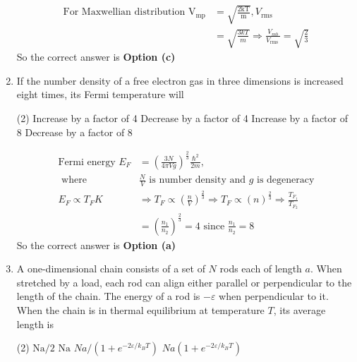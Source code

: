 \begin{enumerate}
\begin{answer}
	\begin{align*}
	\text{For Maxwellian distribution }\mathrm{V}_{\mathrm{mp}}&=\sqrt{\frac{2 \mathrm{kT}}{\mathrm{m}}}, V_{\text {rms }}\\&=\sqrt{\frac{3 k T}{m}} \Rightarrow \frac{V_{m b}}{V_{\text {rms }}}=\sqrt{\frac{2}{3}}
	\end{align*}
	So the correct answer is \textbf{Option (c)}	
\end{answer}
	\item If the number density of a free electron gas in three dimensions is increased eight times, its Fermi temperature will
	{}
	\begin{tasks}(2)
		\task[\textbf{a.}] Increase by a factor of 4
		\task[\textbf{b.}] Decrease by a factor of 4
		\task[\textbf{c.}] Increase by a factor of 8
		\task[\textbf{d.}] Decrease by a factor of 8
	\end{tasks}
\begin{answer}
	\begin{align*}
	\text{Fermi energy }E_{F}&=\left(\frac{3 N}{4 \pi V g}\right)^{\frac{2}{3}} \frac{\hbar^{2}}{2 m},\\\text{ where }&\frac{N}{V}\text{ is number density and $g$ is degeneracy}\\
	E_{F} \propto T_{F} K &\Rightarrow T_{F} \propto\left(\frac{n}{V}\right)^{\frac{2}{3}} \Rightarrow T_{F} \propto(n)^{\frac{2}{3}} \Rightarrow \frac{T_{F_{1}}}{T_{F_{2}}}\\&=\left(\frac{n_{1}}{n_{2}}\right)^{\frac{2}{3}}=4\text{ since } \frac{n_{1}}{n_{2}}=8
	\end{align*}
	So the correct answer is \textbf{Option (a)}
\end{answer}
	\item A one-dimensional chain consists of a set of $N$ rods each of length $a$. When stretched by a load, each rod can align either parallel or perpendicular to the length of the chain. The energy of a rod is $-\varepsilon$ when perpendicular to it. When the chain is in thermal equilibrium at temperature $T$, its average length is
	{}
	\begin{tasks}(2)
		\task[\textbf{a.}] $\mathrm{Na} / 2$
		\task[\textbf{b.}] $\mathrm{Na}$
		\task[\textbf{c.}] $N a /\left(1+e^{-2 \varepsilon / k_{B} T}\right)$
		\task[\textbf{d.}] $N a\left(1+e^{-2 \varepsilon / k_{B} T}\right)$
	\end{tasks}
\begin{answer}

\end{answer}
\end{enumerate}
